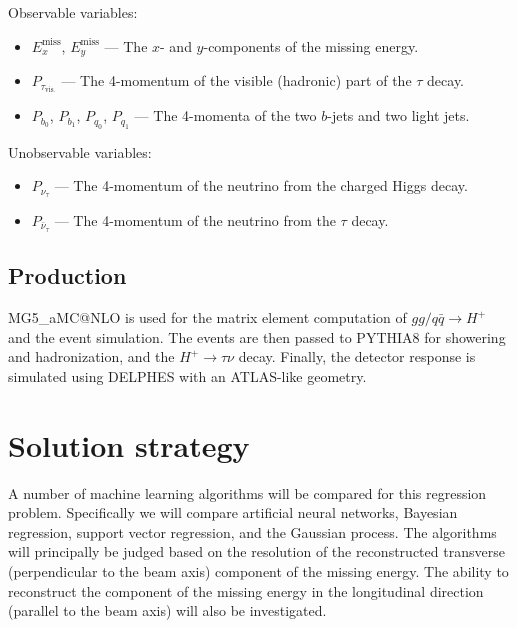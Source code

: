 \documentclass{scrartcl}
\begin{document}
Observable variables:
\begin{itemize}
    \item $E_x^\mathrm{miss}$, $E_y^\mathrm{miss}$ --- The $x$- and $y$-components of the missing energy.
    \item $P_{\tau_\mathrm{vis.}}$ --- The 4-momentum of the visible (hadronic) part of the $\tau$ decay.
    \item $P_{b_0}$, $P_{b_1}$, $P_{q_0}$, $P_{q_1}$ --- The 4-momenta of the two $b$-jets and two light jets.
\end{itemize}

Unobservable variables:
\begin{itemize}
    \item $P_{\nu_\tau}$ --- The 4-momentum of the neutrino from the charged Higgs decay.
    \item $P_{\bar\nu_\tau}$ --- The 4-momentum of the neutrino from the $\tau$ decay.
\end{itemize}

\subsection{Production}
MG5\_aMC@NLO \cite{Alwall:2014hca} is used for the matrix element computation of $gg / q \bar q \to H^+$ and the event simulation. The events are then passed to PYTHIA8 \cite{Sjöstrand2015159} for showering and hadronization, and the $H^+\to \tau\nu$ decay. Finally, the detector response is simulated using DELPHES \cite{Favereau2014} with an ATLAS-like geometry.

\section{Solution strategy}
A number of machine learning algorithms will be compared for this regression problem. Specifically we will compare artificial neural networks, Bayesian regression, support vector regression, and the Gaussian process. The algorithms will principally be judged based on the resolution of the reconstructed transverse (perpendicular to the beam axis) component of the missing energy. The ability to reconstruct the component of the missing energy in the longitudinal direction (parallel to the beam axis) will also be investigated.


\end{document}
